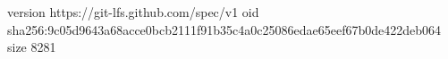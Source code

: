 version https://git-lfs.github.com/spec/v1
oid sha256:9c05d9643a68acce0bcb2111f91b35c4a0c25086edae65eef67b0de422deb064
size 8281
